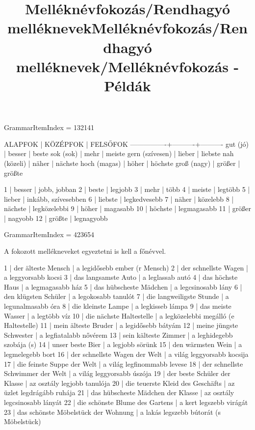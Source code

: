 \title{Melléknévfokozás/Rendhagyó melléknevek}

GrammarItemIndex = 132141

\begin{desc}
ALAPFOK         | KÖZÉPFOK | FELSŐFOK
----------------+----------+----------
gut (jó)        | besser   | beste
sok (sok)       | mehr     | meiste
gern (szívesen) | lieber   | liebste
nah (közeli)    | näher    | nächste
hoch (magas)    | höher    | höchste
groß (nagy)     | größer   | größte
\end{desc}

\begin{exmp}
1 | besser | jobb, jobban
2 | beste | legjobb
3 | mehr | több
4 | meiste | legtöbb
5 | lieber | inkább, szívesebben
6 | liebste | legkedvesebb
7 | näher | közelebb
8 | nächste | legközelebbi
9 | höher | magasabb
10 | höchste | legmagasabb
11 | größer | nagyobb
12 | größte | legnagyobb
\end{exmp}

\title{Melléknévfokozás/Rendhagyó melléknevek/Melléknévfokozás - Példák}

GrammarItemIndex = 423654

\begin{desc}
A fokozott mellékneveket egyeztetni is kell a főnévvel.
\end{desc}

\begin{exmp}
1 | der älteste Mensch | a legidősebb ember (r Mensch)
2 | der schnellste Wagen | a leggyorsabb kocsi
3 | das langsamste Auto | a leglassab autó
4 | das höchste Haus | a legmagasabb ház
5 | das hübscheste Mädchen | a legcsinosabb lány
6 | den klügsten Schüler | a legokosabb tanulót
7 | die langweiligste Stunde | a legunalmasabb óra
8 | die kleinste Lampe | a legkisseb lámpa
9 | das meiste Wasser | a legtöbb víz
10 | die nächste Haltestelle | a legközelebbi megálló (e Haltestelle)
11 | mein älteste Bruder | a legidősebb bátyám
12 | meine jüngste Schwester | a legfiatalabb nővérem
13 | sein kälteste Zimmer | a leghidegebb szobája (s)
14 | unser beste Bier | a legjobb sörünk
15 | den wärmsten Wein | a legmelegebb bort
16 | der schnellste Wagen der Welt | a világ leggyorsabb kocsija
17 | die feinste Suppe der Welt | a világ legfinommabb levese
18 | der schnellste Schwimmer der Welt | a világ leggyorsabb úszója
19 | der beste Schüler der Klasse | az osztály legjobb tanulója
20 | die teuerste Kleid des Geschäfts | az üzlet legdrágább ruhája
21 | das hübscheste Mädchen der Klasse | az osztály legcsinosabb lányát
22 | die schönste Blume des Gartens | a kert legszebb virágát
23 | das schönste Möbelstück der Wohnung | a lakás legszebb bútorát (s Möbelstück)
\end{exmp}

